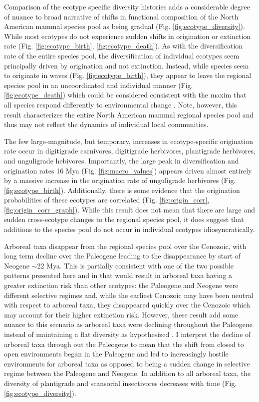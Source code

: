 \documentclass[12pt,letterpaper]{article}
\begin{document}
Comparison of the ecotype specific diversity histories adds a considerable degree of nuance to broad narrative of shifts in functional composition of the North American mammal species pool as being gradual (Fig. \ref{fig:ecotype_diversity}). While most ecotypes do not experience sudden shifts in origination or extinction rate (Fig. \ref{fig:ecotype_birth}, \ref{fig:ecotype_death}). As with the diversification rate of the entire species pool, the diversification of individual ecotypes seem principally driven by origination and not extinction. Instead, while species seem to originate in waves (Fig. \ref{fig:ecotype_birth}), they appear to leave the regional species pool in an uncoordinated and individual manner (Fig. \ref{fig:ecotype_death}) which could be considered consistent with the maxim that all species respond differently to environmental change \citep{Blois2009}. Note, however, this result characterizes the entire North American mammal regional species pool and thus may not reflect the dynamics of individual local communities.

The few large-magnitude, but temporary, increases in ecotype-specific origination rate occur in digitigrade carnivores, digitigrade herbivores, plantigrade herbivores, and unguligrade hebivores. Importantly, the large peak in diversification and origination rates 16 Mya (Fig. \ref{fig:macro_values}) appears driven almost entirely by a massive increase in the origination rate of unguligrade herbivores (Fig. \ref{fig:ecotype_birth}). Additionally, there is some evidence that the origination probabilities of these ecotypes are correlated (Fig. \ref{fig:origin_corr}, \ref{fig:origin_corr_graph}). While this result does not mean that there are large and sudden cross-ecotype changes to the regional species pool, it does suggest that additions to the species pool do not occur in individual ecotypes idiosyncratically.

Arboreal taxa disappear from the regional species pool over the Cenozoic, with long term decline over the Paleogene leading to the disappearance by start of Neogene \(\sim\)22 Mya. This is partially consistent with one of the two possible patterns presented here and in \citet{Smits2015b} that would result in arboreal taxa having a greater extinction risk than other ecotypes: the Paleogene and Neogene were different selective regimes and, while the earliest Cenozoic may have been neutral with respect to arboreal taxa, they disappeared quickly over the Cenozoic which may account for their higher extinction risk. However, these result add some nuance to this scenario as arboreal taxa were declining throughout the Paleogene instead of maintaining a flat diversity as hypothesized \citep{Smits2015b}. I interpret the decline of arboreal taxa through out the Paleogene to mean that the shift from closed to open environments began in the Paleogene and led to increasingly hostile environments for arboreal taxa as opposed to being a sudden change in selective regime between the Paleogene and Neogene. In addition to all arboreal taxa, the diversity of plantigrade and scansorial insectivores decreases with time (Fig. \ref{fig:ecotype_diversity}).
\end{document}
